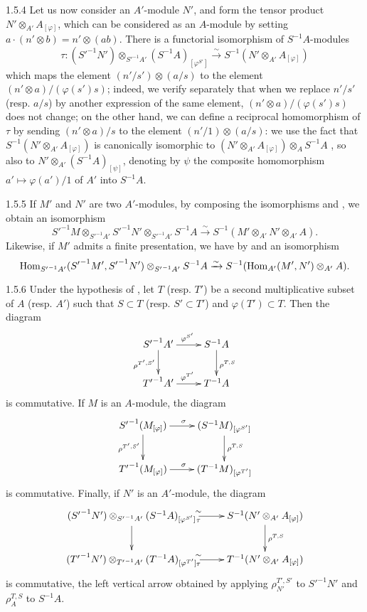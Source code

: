 \documentclass{book}
\begin{document}
\begin{env}{1.5.4}
\label{env-0.1.5.4}
Let us now consider an $A'$-module $N'$, and form the tensor product $N'\otimes_{A'}A_{[\varphi]}$,
which can be considered as an $A$-module by setting $a\cdot(n'\otimes b)=n'\otimes(ab)$. There is a
functorial isomorphism of $S^{-1}A$-modules
\[
  \tau\colon({S'}^{-1}N')\otimes_{{S'}^{-1}A'}(S^{-1}A)_{[\varphi^{S'}]}
  \xrightarrow{\sim}S^{-1}(N'\otimes_{A'}A_{[\varphi]})
\]
which maps the element $(n'/s')\otimes(a/s)$ to the element $(n'\otimes a)/(\varphi(s')s)$;
indeed, we verify separately that when we replace $n'/s'$ (resp. $a/s$) by another expression of the
same element, $(n'\otimes a)/(\varphi(s')s)$ does not change; on the other hand, we can define a
reciprocal homomorphism of $\tau$ by sending $(n'\otimes a)/s$ to the element $(n'/1)\otimes(a/s)$:
we use the fact that $S^{-1}(N'\otimes_{A'}A_{[\varphi]})$ is canonically isomorphic to
$(N'\otimes_{A'}A_{[\varphi]})\otimes_A S^{-1}A$ , so also to $N'\otimes_{A'}(S^{-1}A)_{[\psi]}$,
denoting by $\psi$ the composite homomorphism $a'\mapsto\varphi(a')/1$ of $A'$ into $S^{-1}A$.
\end{env}

\begin{env}{1.5.5}
\label{env-0.1.5.5}
If $M'$ and $N'$ are two $A'$-modules, by composing the isomorphisms  and , we obtain
an isomorphism
\[
  {S'}^{-1}M\otimes_{{S'}^{-1}A'}{S'}^{-1}N'\otimes_{{S'}^{-1}A'}S^{-1}A
  \xrightarrow{\sim}S^{-1}(M'\otimes_{A'}N'\otimes_{A'}A).
\]
Likewise, if $M'$ admits a finite presentation, we have by  and  an isomorphism
\[
  {\mathop{\mathrm{Hom}}\nolimits}_{{S'}^{-1}A'}({S'}^{-1}M',{S'}^{-1}N')\otimes_{{S'}^{-1}A'}S^{-1}A
  \xrightarrow{\sim}S^{-1}({\mathop{\mathrm{Hom}}\nolimits}_{A'}(M',N')\otimes_{A'}A).
\]
\end{env}

\begin{env}{1.5.6}
\label{env-0.1.5.6}
Under the hypothesis of , let $T$ (resp. $T'$) be a second multiplicative subset of $A$
(resp. $A'$) such that $S\subset T$ (resp. $S'\subset T'$) and $\varphi(T')\subset T$. Then the diagram
\[
  \xymatrix{
    {S'}^{-1}A'\ar[r]^{\varphi^{S'}}\ar[d]_{\rho^{T',S'}} & S^{-1}A\ar[d]^{\rho^{T,S}}\\
    {T'}^{-1}A'\ar[r]^{\varphi^{T'}} & T^{-1}A
  }
\]
is commutative. If $M$ is an $A$-module, the diagram
\[
  \xymatrix{
    {S'}^{-1}(M_{[\varphi]})\ar[r]^\sigma\ar[d]_{\rho^{T',S'}} &
    (S^{-1}M)_{[\varphi^{S'}]}\ar[d]^{\rho^{T,S}}\\
    {T'}^{-1}(M_{[\varphi]})\ar[r]^\sigma & (T^{-1}M)_{[\varphi^{T'}]}
  }
\]
is commutative. Finally, if $N'$ is an $A'$-module, the diagram
\[
  \xymatrix{
    ({S'}^{-1}N')\otimes_{{S'}^{-1}A'}(S^{-1}A)_{[\varphi^{S'}]}\ar[r]^\sim_\tau\ar[d] &
    S^{-1}(N'\otimes_{A'}A_{[\varphi]})\ar[d]^{\rho^{T,S}}\\
    ({T'}^{-1}N')\otimes_{{T'}^{-1}A'}(T^{-1}A)_{[\varphi^{T'}]}
    \ar[r]^\sim_\tau & T^{-1}(N'\otimes_{A'}A_{[\varphi]})
  }
\]
is commutative, the left vertical arrow obtained by applying
$\rho_{N'}^{T',S'}$ to ${S'}^{-1}N'$ and $\rho_A^{T,S}$ to $S^{-1}A$.
\end{env}
\end{document}

